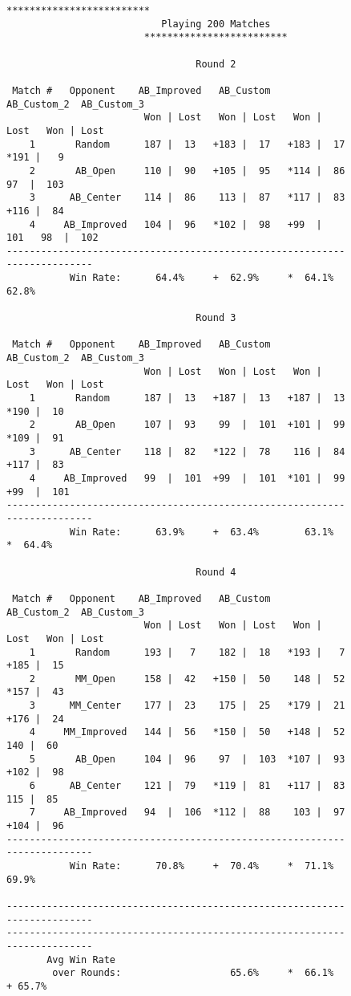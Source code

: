 \documentclass[12pt]{article}
\begin{document}
\begin{figure}[H]
\begin{Verbatim}[fontsize=\footnotesize]
                        *************************                         
                           Playing 200 Matches                              
                        *************************                         
                                 
                                 Round 2                             
 
 Match #   Opponent    AB_Improved   AB_Custom   AB_Custom_2  AB_Custom_3 
                        Won | Lost   Won | Lost   Won | Lost   Won | Lost 
    1       Random      187 |  13   +183 |  17   +183 |  17   *191 |   9  
    2       AB_Open     110 |  90   +105 |  95   *114 |  86    97  |  103 
    3      AB_Center    114 |  86    113 |  87   *117 |  83   +116 |  84  
    4     AB_Improved   104 |  96   *102 |  98   +99  |  101   98  |  102 
--------------------------------------------------------------------------
           Win Rate:      64.4%     +  62.9%     *  64.1%        62.8%  

                                 Round 3                             

 Match #   Opponent    AB_Improved   AB_Custom   AB_Custom_2  AB_Custom_3 
                        Won | Lost   Won | Lost   Won | Lost   Won | Lost 
    1       Random      187 |  13   +187 |  13   +187 |  13   *190 |  10  
    2       AB_Open     107 |  93    99  |  101  +101 |  99   *109 |  91  
    3      AB_Center    118 |  82   *122 |  78    116 |  84   +117 |  83  
    4     AB_Improved   99  |  101  +99  |  101  *101 |  99   +99  |  101 
--------------------------------------------------------------------------
           Win Rate:      63.9%     +  63.4%        63.1%     *  64.4%    

                                 Round 4                             

 Match #   Opponent    AB_Improved   AB_Custom   AB_Custom_2  AB_Custom_3 
                        Won | Lost   Won | Lost   Won | Lost   Won | Lost 
    1       Random      193 |   7    182 |  18   *193 |   7   +185 |  15  
    2       MM_Open     158 |  42   +150 |  50    148 |  52   *157 |  43  
    3      MM_Center    177 |  23    175 |  25   *179 |  21   +176 |  24  
    4     MM_Improved   144 |  56   *150 |  50   +148 |  52    140 |  60  
    5       AB_Open     104 |  96    97  |  103  *107 |  93   +102 |  98  
    6      AB_Center    121 |  79   *119 |  81   +117 |  83    115 |  85  
    7     AB_Improved   94  |  106  *112 |  88    103 |  97   +104 |  96  
--------------------------------------------------------------------------
           Win Rate:      70.8%     +  70.4%     *  71.1%        69.9%    

--------------------------------------------------------------------------
--------------------------------------------------------------------------
       Avg Win Rate
        over Rounds:                   65.6%     *  66.1%      + 65.7%    
\end{Verbatim}
\end{figure}
\end{document}
